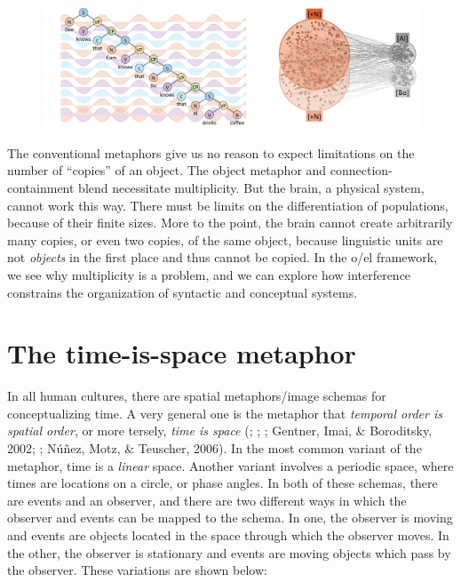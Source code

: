   
\begin{figure}
\includegraphics[width=\textwidth]{figures/Tilsen-img37.png}
\caption{\missingcaption}
\label{fig:}
\end{figure}
 

  The conventional metaphors give us no reason to expect limitations on the number of “copies” of an object. The object metaphor and connection-containment blend necessitate multiplicity. But the brain, a physical system, cannot work this way. There must be limits on the differentiation of populations, because of their finite sizes. More to the point, the brain cannot create arbitrarily many copies, or even two copies, of the same object, because linguistic units are not \textit{objects} in the first place and thus cannot be copied. In the o/el framework, we see why multiplicity is a problem, and we can explore how interference constrains the organization of syntactic and conceptual systems.

\section{The time-is-space metaphor}

In all human cultures, there are spatial metaphors/image schemas for conceptualizing time. A very general one is the metaphor that \textit{temporal order is spatial order}, or more tersely, \textit{time is space} (\citealt{Boroditsky20002001}; \citealt{CasasantoBoroditsky2008}; \citealt{Evans2006}; Gentner, Imai, \& Boroditsky, 2002; \citealt{LakoffJohnson1999}; Núñez, Motz, \& Teuscher, 2006). In the most common variant of the metaphor, time is a \textit{linear} space. Another variant involves a periodic space, where times are locations on a circle, or phase angles. In both of these schemas, there are events and an observer, and there are two different ways in which the observer and events can be mapped to the schema. In one, the observer is moving and events are objects located in the space through which the observer moves. In the other, the observer is stationary and events are moving objects which pass by the observer. These variations are shown below:

